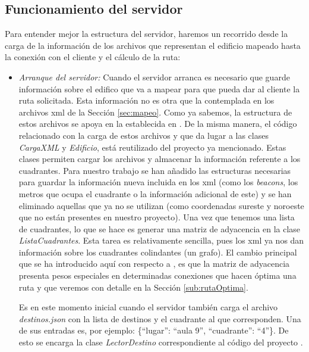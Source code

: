 \subsection{Funcionamiento del servidor}

Para entender mejor la estructura del servidor, haremos un recorrido desde la carga de la información de los archivos que representan el edificio mapeado hasta la conexión con el cliente y el cálculo de la ruta: 

\begin{itemize}
	\item \textit{Arranque del servidor:} Cuando el servidor arranca es necesario que guarde información sobre el edifico que va a mapear para que pueda dar al cliente la ruta solicitada. Esta información no es otra que la contemplada en los archivos xml de la Sección \ref{sec:mapeo}. Como ya sabemos, la estructura de estos archivos se apoya en la establecida en \cite{TFGguia}. De la misma manera, el código relacionado con la carga de estos archivos y que da lugar a las clases \textit{CargaXML} y \textit{Edificio}, está reutilizado del proyecto ya mencionado. Estas clases permiten cargar los archivos y almacenar la información referente a los cuadrantes. Para nuestro trabajo se han añadido las estructuras necesarias para guardar la información nueva incluida en los xml (como los \textit{beacons}, los metros que ocupa el cuadrante o la información adicional de este) y se han eliminado aquellas que ya no se utilizan (como coordenadas sureste y noroeste que no están presentes en nuestro proyecto). Una vez que tenemos una lista de cuadrantes, lo que se hace es generar una matriz de adyacencia en la clase \textit{ListaCuadrantes}. Esta tarea es relativamente sencilla, pues los xml ya nos dan información sobre los cuadrantes colindantes (un grafo). El cambio principal que se ha introducido aquí con respecto a \citep{TFGguia}, es que la matriz de adyacencia presenta pesos especiales en determinadas conexiones que hacen óptima una ruta y que veremos con detalle en la Sección \ref{sub:rutaOptima}. 
	
	Es en este momento inicial cuando el servidor también carga el archivo \textit{destinos.json} con la lista de destinos y el cuadrante al que corresponden. Una de sus entradas es, por ejemplo: \{``lugar'': ``aula 9'', ``cuadrante'': ``4''\}. De esto se encarga la clase \textit{LectorDestino} correspondiente al código del proyecto \cite{TFGguia}.
	

\end{itemize}
